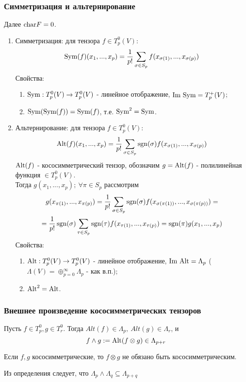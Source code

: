 \subsubsection*{Симметризация и альтернирование}
Далее $\textup{char} F = 0$.
\begin{enumerate}
    \item Симметризация: для тензора $f \in T_p^0(V)$:
    \[\textup{Sym}(f)(x_1,...,x_p) = \frac{1}{p!}\sum \limits_{\sigma \in S_p}f(x_{\sigma(1)},...,x_{\sigma(p)})\]
    Свойства:
    \begin{enumerate}
        \item $\textup{Sym}: T_p^0(V) \rightarrow T_p^0(V)$ - линейное отображение, $\textup{Im }\textup{Sym} = T_p^+(V)$;
        \item $\textup{Sym}(\textup{Sym}(f)) = \textup{Sym}(f)$, т.е. $\textup{Sym}^2 = \textup{Sym}$.
    \end{enumerate}
    \item Альтернирование: для тензора $f \in T_p^0(V)$:
    \[\textup{Alt}(f)(x_1,...,x_p) = \frac{1}{p!}\sum \limits_{\sigma \in S_p} \operatorname{sgn}(\sigma)f(x_{\sigma(1)},...,x_{\sigma(p)})\]
    $\textup{Alt}(f)$ - кососимметрический тензор, обозначим $g = \textup{Alt}(f)$ - полилинейная функция $\in T_p^0(V)$.\\
    Тогда $g(x_1,...,x_p);\ \forall \pi \in S_p$ рассмотрим
    \begin{multline*}
        g(x_{\pi(1)},...,x_{\pi(p)}) = \frac{1}{p!}\sum \limits_{\sigma \in S_p} \operatorname{sgn}(\sigma)f(x_{\sigma(\pi(1))},...,x_{\sigma(\pi(p))}) =\\= \frac{1}{p!}\operatorname{sgn}(\sigma)\sum \limits_{\tau \in S_p} \operatorname{sgn}(\tau)f(x_{\tau(1)},...,x_{\tau(p)}) = \operatorname{sgn}(\pi)g(x_1,...,x_p)
    \end{multline*}
     Свойства:
    \begin{enumerate}
        \item $\textup{Alt}: T_p^0(V) \rightarrow T_p^0(V)$ - линейное отображение, $\textup{Im }\textup{Alt} = \Lambda_p$ ($\Lambda(V) = \oplus_{p = 0}^\infty \Lambda_p$ - как в.п.);
        \item $\textup{Alt}^2 = \textup{Alt}$.
    \end{enumerate}
\end{enumerate}
\subsubsection*{Внешнее произведение кососимметрических тензоров}
\begin{definition}
    Пусть $f \in T_p^0, g \in T_r^0$. Тогда $Alt(f) \in \Lambda_p, \ Alt(g) \in \Lambda_r$, и
    \[f \wedge g := \textup{Alt}(f \otimes g) \in \Lambda_{p+r}\]
\end{definition}
\begin{remark}
    Если $f, g$ кососимметрические, то $f \otimes g$ не обязано быть кососимметрическим.
\end{remark}
Из определения следует, что $\Lambda_p \wedge \Lambda_q \subseteq \Lambda_{p+q}$
